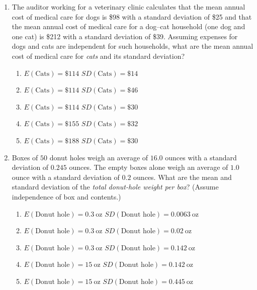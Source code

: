 \documentclass{article}
\begin{document}
\begin{enumerate}[label=\textbf{S\arabic*.}]
\item The auditor working for a veterinary clinic calculates that the mean annual cost of medical care for dogs is \$98 with a standard deviation of \$25 and that the mean annual cost of medical care for a dog–cat household (one dog and one cat) is \$212 with a standard deviation of \$39. Assuming expenses for dogs and cats are independent for such households, what are the mean annual cost of medical care for \emph{cats} and its standard deviation? 
\begin{enumerate}
  \item $E(\text{Cats})=\$114$ $SD(\text{Cats})=\$14$
  \item $E(\text{Cats})=\$114$ $SD(\text{Cats})=\$46$
  \item $E(\text{Cats})=\$114$ $SD(\text{Cats})=\$30$
  \item $E(\text{Cats})=\$155$ $SD(\text{Cats})=\$32$
  \item $E(\text{Cats})=\$188$ $SD(\text{Cats})=\$30$
\end{enumerate}

\item Boxes of $50$ donut holes weigh an average of $16.0$ ounces with a standard deviation of $0.245$ ounces. The empty boxes alone weigh an average of $1.0$ ounce with a standard deviation of $0.2$ ounces. What are the mean and standard deviation of the \emph{total donut-hole weight per box}? (Assume independence of box and contents.) 
\begin{enumerate}
  \item $E(\text{Donut hole})=0.3\ \text{oz}$ $SD(\text{Donut hole})=0.0063\ \text{oz}$
  \item $E(\text{Donut hole})=0.3\ \text{oz}$ $SD(\text{Donut hole})=0.02\ \text{oz}$
  \item $E(\text{Donut hole})=0.3\ \text{oz}$ $SD(\text{Donut hole})=0.142\ \text{oz}$
  \item $E(\text{Donut hole})=15\ \text{oz}$ $SD(\text{Donut hole})=0.142\ \text{oz}$
  \item $E(\text{Donut hole})=15\ \text{oz}$ $SD(\text{Donut hole})=0.445\ \text{oz}$
\end{enumerate}


\end{enumerate}
\end{document}
